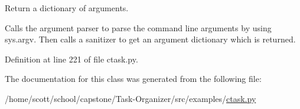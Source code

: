 \-Return a dictionary of arguments. 

\-Calls the argument parser to parse the command line arguments by using sys.\-argv. \-Then calls a sanitizer to get an argument dictionary which is returned. 

\-Definition at line 221 of file ctask.\-py.



\-The documentation for this class was generated from the following file\-:\begin{DoxyCompactItemize}
\item 
/home/scott/school/capstone/\-Task-\/\-Organizer/src/examples/\hyperlink{ctask_8py}{ctask.\-py}\end{DoxyCompactItemize}
